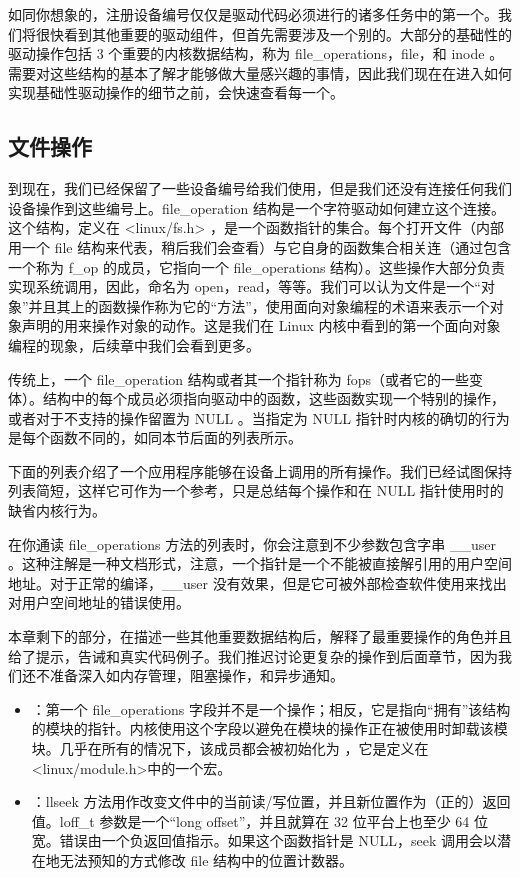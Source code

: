 \documentclass[lang=cn,newtx,10pt,scheme=chinese]{elegantbook}
\begin{document}
如同你想象的，注册设备编号仅仅是驱动代码必须进行的诸多任务中的第一个。我们将很快看到其他重要的驱动组件，但首先需要涉及一个别的。大部分的基础性的驱动操作包括 3 个重要的内核数据结构，称为 file\_operations，file，和 inode 。需要对这些结构的基本了解才能够做大量感兴趣的事情，因此我们现在在进入如何实现基础性驱动操作的细节之前，会快速查看每一个。

\subsection{文件操作}

到现在，我们已经保留了一些设备编号给我们使用，但是我们还没有连接任何我们设备操作到这些编号上。file\_operation 结构是一个字符驱动如何建立这个连接。这个结构，定义在 <linux/fs.h> ，是一个函数指针的集合。每个打开文件（内部用一个 file 结构来代表，稍后我们会查看）与它自身的函数集合相关连（通过包含一个称为 f\_op 的成员，它指向一个 file\_operations 结构）。这些操作大部分负责实现系统调用，因此，命名为 open，read，等等。我们可以认为文件是一个``对象''并且其上的函数操作称为它的``方法''，使用面向对象编程的术语来表示一个对象声明的用来操作对象的动作。这是我们在 Linux 内核中看到的第一个面向对象编程的现象，后续章中我们会看到更多。

传统上，一个 file\_operation 结构或者其一个指针称为 fops（或者它的一些变体）。结构中的每个成员必须指向驱动中的函数，这些函数实现一个特别的操作，或者对于不支持的操作留置为 NULL 。当指定为 NULL 指针时内核的确切的行为是每个函数不同的，如同本节后面的列表所示。

下面的列表介绍了一个应用程序能够在设备上调用的所有操作。我们已经试图保持列表简短，这样它可作为一个参考，只是总结每个操作和在 NULL 指针使用时的缺省内核行为。

在你通读 file\_operations 方法的列表时，你会注意到不少参数包含字串 \_\_user 。这种注解是一种文档形式，注意，一个指针是一个不能被直接解引用的用户空间地址。对于正常的编译，\_\_user 没有效果，但是它可被外部检查软件使用来找出对用户空间地址的错误使用。

本章剩下的部分，在描述一些其他重要数据结构后，解释了最重要操作的角色并且给了提示，告诫和真实代码例子。我们推迟讨论更复杂的操作到后面章节，因为我们还不准备深入如内存管理，阻塞操作，和异步通知。

\begin{itemize}
    \item {}：第一个 file\_operations 字段并不是一个操作；相反，它是指向``拥有''该结构的模块的指针。内核使用这个字段以避免在模块的操作正在被使用时卸载该模块。几乎在所有的情况下，该成员都会被初始化为  ，它是定义在<linux/module.h>中的一个宏。
    \item {}：llseek 方法用作改变文件中的当前读/写位置，并且新位置作为（正的）返回值。loff\_t 参数是一个``long offset''，并且就算在 32 位平台上也至少 64 位宽。错误由一个负返回值指示。如果这个函数指针是 NULL，seek 调用会以潜在地无法预知的方式修改 file 结构中的位置计数器。
\end{itemize}
\end{document}
